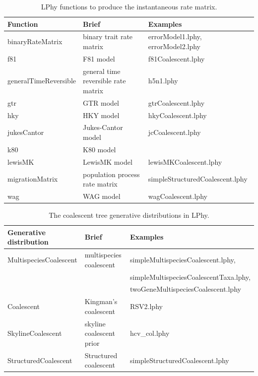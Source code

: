 \documentclass[12pt]{article} %
\begin{document}
\begin{table}
\small
\centering
\begin{tabular}{ l | l | l }
    \hline\hline
    Function & Brief & Examples \\ 
    \hline\hline
    binaryRateMatrix & binary trait rate matrix & errorModel1.lphy, errorModel2.lphy\\  
    f81 & F81 model\cite{felsenstein1981} & f81Coalescent.lphy\\  
    generalTimeReversible & general time reversible rate matrix & h5n1.lphy \\  
    gtr & GTR model\cite{tarvare1986some} & gtrCoalescent.lphy\\  
    hky & HKY model\cite{hasegawa1985dating} & hkyCoalescent.lphy\\  
    jukesCantor & Jukes-Cantor model\cite{jc69} & jcCoalescent.lphy\\  
    k80 & K80 model\cite{kimura1980simple} & \\  
    lewisMK & LewisMK model\cite{lewis2001likelihood} & lewisMKCoalescent.lphy\\  
    migrationMatrix & population process rate matrix & simpleStructuredCoalescent.lphy\\  
    wag & WAG model\cite{whelan2001general} & wagCoalescent.lphy\\  
    \hline
\end{tabular}

\label{tab:ratematrix}
\caption{LPhy functions to produce the instantaneous rate matrix.}
\end{table}

\begin{table}
\small
\begin{tabular}{ l | l | l }
    \hline\hline
    Generative distribution & Brief & Examples \\ 
    \hline\hline
    MultispeciesCoalescent & multispecies coalescent & simpleMultispeciesCoalescent.lphy, \\ & & simpleMultispeciesCoalescentTaxa.lphy, \\ & & twoGeneMultispeciesCoalescent.lphy\\  
    Coalescent & Kingman's coalescent \cite{Rodrigo1999SerialCoalescent} & RSV2.lphy \\  
    SkylineCoalescent & skyline coalescent prior\cite{drummond2005bayesiansequences} & hcv\_col.lphy\\  
    StructuredCoalescent & Structured coalescent\cite{muller2017structured} & simpleStructuredCoalescent.lphy\\  
    \hline
\end{tabular}

\label{tab:coalescent}
\caption{The coalescent tree generative distributions in LPhy.}
\end{table}
\end{document}
